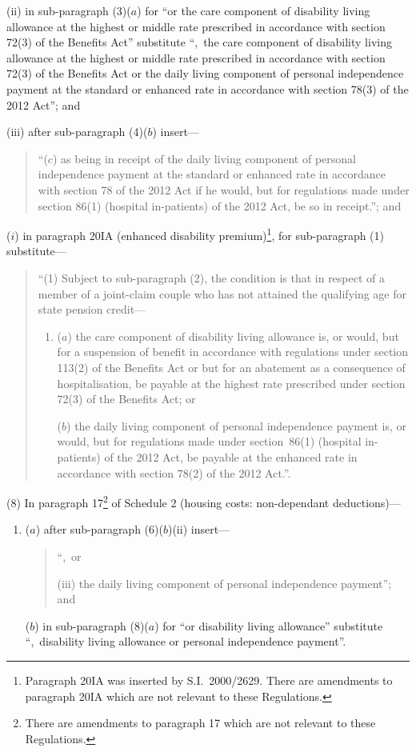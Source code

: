 \documentclass[12pt,a4paper]{article}
\begin{document}
\begin{enumerate}
\begin{enumerate}
(ii) in sub-paragraph (3)($a$)  for “or the care component of disability living allowance at the highest or middle rate prescribed in accordance with section 72(3) of the Benefits Act” substitute “,~the care component of disability living allowance at the highest or middle rate prescribed in accordance with section 72(3) of the Benefits Act or the daily living component of personal independence payment at the standard or enhanced rate in accordance with section 78(3) of the 2012 Act”; and

(iii) after sub-paragraph (4)($b$)  insert—
\begin{quotation}
“($c$) as being in receipt of the daily living component of personal independence payment at the standard or enhanced rate in accordance with section 78 of the 2012 Act if he would, but for regulations made under section 86(1) (hospital in-patients) of the 2012 Act, be so in receipt.”; and
\end{quotation}
\end{enumerate}

($i$) in paragraph 20IA (enhanced disability premium)\footnote{Paragraph 20IA was inserted by S.I.~2000/2629. There are amendments to paragraph 20IA which are not relevant to these Regulations.}, for sub-paragraph (1) substitute—
\begin{quotation}
“(1) Subject to sub-paragraph (2), the condition is that in respect of a member of a joint-claim couple who has not attained the qualifying age for state pension credit—
\begin{enumerate}\item[]
($a$) the care component of disability living allowance is, or would, but for a suspension of benefit in accordance with regulations under section 113(2) of the Benefits Act or but for an abatement as a consequence of hospitalisation, be payable at the highest rate prescribed under section 72(3) of the Benefits Act; or

($b$) the daily living component of personal independence payment is, or would, but for regulations made under section~86(1) (hospital in-patients) of the 2012 Act, be payable at the enhanced rate in accordance with section 78(2) of the 2012 Act.”.
\end{enumerate}
\end{quotation}
\end{enumerate}

(8) In paragraph 17\footnote{There are amendments to paragraph 17 which are not relevant to these Regulations.} of Schedule 2 (housing costs: non-dependant deductions)—
\begin{enumerate}\item[]
($a$) after sub-paragraph (6)($b$)(ii)  insert—
\begin{quotation}
“,~or

(iii) the daily living component of personal independence payment”; and
\end{quotation}

($b$) in sub-paragraph (8)($a$)  for “or disability living allowance” substitute “,~disability living allowance or personal independence payment”.
\end{enumerate}
\end{document}
